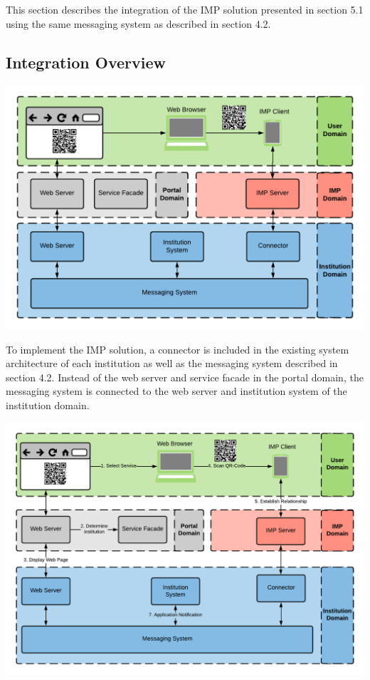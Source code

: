 This section describes the integration of the IMP solution presented in section 5.1 using the same messaging system as described in section 4.2.

\subsection{Integration Overview}

\begin{center}
    \includegraphics[scale=0.6]{Diagrams/Integration Architecture 2/Technological Integration/1. Integration Overview.pdf}
\end{center}

To implement the IMP solution, a connector is included in the existing system architecture of each institution as well as the messaging system described in section 4.2. Instead of the web server and service facade in the portal domain, the messaging system is connected to the web server and institution system of the institution domain.

\begin{center}
    \includegraphics[scale=0.6]{Diagrams/Integration Architecture 2/Technological Integration/3. Application Overview.pdf}
\end{center}

